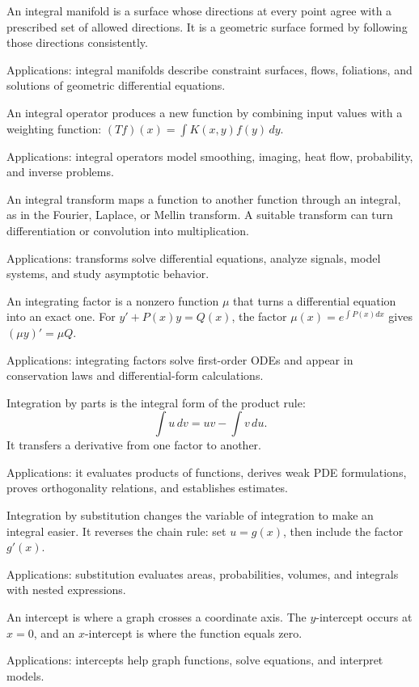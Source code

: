 An integral manifold is a surface whose directions at every point agree with a prescribed set of allowed directions. It is a geometric surface formed by following those directions consistently. \par\noindent Applications: integral manifolds describe constraint surfaces, flows, foliations, and solutions of geometric differential equations.

An integral operator produces a new function by combining input values with a weighting function: $(Tf)(x)=\int K(x,y)f(y)\,dy$. \par\noindent Applications: integral operators model smoothing, imaging, heat flow, probability, and inverse problems.

An integral transform maps a function to another function through an integral, as in the Fourier, Laplace, or Mellin transform. A suitable transform can turn differentiation or convolution into multiplication. \par\noindent Applications: transforms solve differential equations, analyze signals, model systems, and study asymptotic behavior.

An integrating factor is a nonzero function $\mu$ that turns a differential equation into an exact one. For $y'+P(x)y=Q(x)$, the factor $\mu(x)=e^{\int P(x)dx}$ gives $(\mu y)'=\mu Q$. \par\noindent Applications: integrating factors solve first-order ODEs and appear in conservation laws and differential-form calculations.

Integration by parts is the integral form of the product rule:
\[
\int u\,dv=uv-\int v\,du.
\]
It transfers a derivative from one factor to another. \par\noindent Applications: it evaluates products of functions, derives weak PDE formulations, proves orthogonality relations, and establishes estimates.

Integration by substitution changes the variable of integration to make an integral easier. It reverses the chain rule: set $u=g(x)$, then include the factor $g'(x)$. \par\noindent Applications: substitution evaluates areas, probabilities, volumes, and integrals with nested expressions.

An intercept is where a graph crosses a coordinate axis. The $y$-intercept occurs at $x=0$, and an $x$-intercept is where the function equals zero. \par\noindent Applications: intercepts help graph functions, solve equations, and interpret models.

